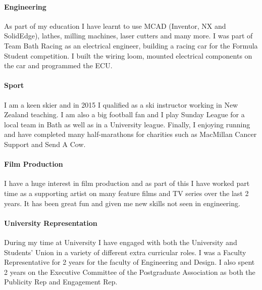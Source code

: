\documentclass[letterpaper]{twentysecondcv} %
\begin{document}
\paragraph{\Large Engineering}
As part of my education I have learnt to use MCAD (Inventor, NX and SolidEdge), lathes, milling machines, laser cutters and many more. I was part of Team Bath Racing as an electrical engineer, building a racing car for the Formula Student competition. I built the wiring loom, mounted electrical components on the car and programmed the ECU.

\paragraph{\Large Sport}
I am a keen skier and in 2015 I qualified as a ski instructor working in New Zealand teaching. I am also a big football fan and I play Sunday League for a local team in Bath as well as in a University league. Finally, I enjoying running and have completed many half-marathons for charities such as MacMillan Cancer Support and Send A Cow.

\paragraph{\Large Film Production}
I have a huge interest in film production and as part of this I have worked part time as a supporting artist on many feature films and TV series over the last 2 years. It has been great fun and given me new skills not seen in engineering. 

\paragraph{\Large University Representation}
During my time at University I have engaged with both the University and Students' Union in a variety of different extra curricular roles. I was a Faculty Representative for 2 years for the faculty of Engineering and Design.
I also spent 2 years on the Executive Committee of the Postgraduate Association as both the Publicity Rep and Engagement Rep.
\end{document}
